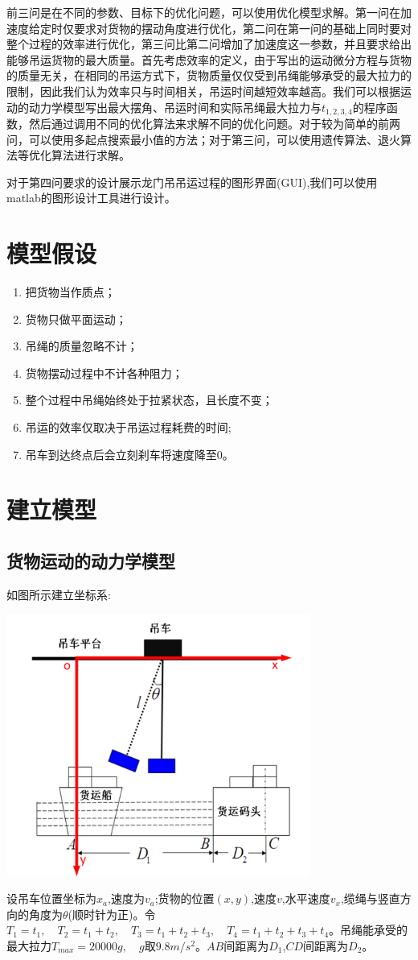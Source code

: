 \documentclass[withoutpreface,bwprint]{cumcmthesis} %
\begin{document}
前三问是在不同的参数、目标下的优化问题，可以使用优化模型求解。第一问在加速度给定时仅要求对货物的摆动角度进行优化，第二问在第一问的基础上同时要对整个过程的效率进行优化，第三问比第二问增加了加速度这一参数，并且要求给出能够吊运货物的最大质量。首先考虑效率的定义，由于写出的运动微分方程与货物的质量无关，在相同的吊运方式下，货物质量仅仅受到吊绳能够承受的最大拉力的限制，因此我们认为效率只与时间相关，吊运时间越短效率越高。我们可以根据运动的动力学模型写出最大摆角、吊运时间和实际吊绳最大拉力与$t_{1,2,3,4}$的程序函数，然后通过调用不同的优化算法来求解不同的优化问题。对于较为简单的前两问，可以使用多起点搜索最小值的方法；对于第三问，可以使用遗传算法、退火算法等优化算法进行求解。

对于第四问要求的设计展示龙门吊吊运过程的图形界面(GUI),我们可以使用matlab的图形设计工具进行设计。

\section{模型假设}
\begin{enumerate}
    \item 把货物当作质点；
    \item 货物只做平面运动；
    \item 吊绳的质量忽略不计；
    \item 货物摆动过程中不计各种阻力；
    \item 整个过程中吊绳始终处于拉紧状态，且长度不变；
    \item 吊运的效率仅取决于吊运过程耗费的时间;
    \item 吊车到达终点后会立刻刹车将速度降至0。
\end{enumerate}

\section{建立模型}
\subsection{货物运动的动力学模型}
如图所示建立坐标系:

\centerline{\includegraphics[width=10cm]{1.png}}
设吊车位置坐标为$x_a$,速度为$v_a$;货物的位置$(x,y)$,速度$v$,水平速度$v_{x}$,缆绳与竖直方向的角度为$\theta$(顺时针为正)。令$T_1=t_1,\quad T_2=t_1+t_2,\quad T_3=t_1+t_2+t_3,\quad T_4=t_1+t_2+t_3+t_4$。吊绳能承受的最大拉力$T_{max}=20000g,\quad g$取$9.8m/s^2$。$AB$间距离为$D_1$,$CD$间距离为$D_2$。
\end{document}

